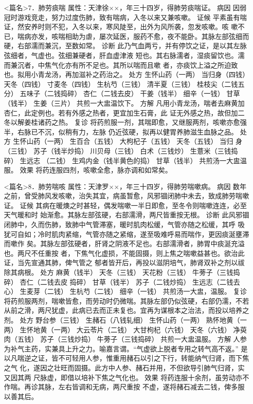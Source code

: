 \documentclass[a4paper,12pt,UTF8,twoside]{ctexbook}
\begin{document}
<篇名>7．肺劳痰喘
属性：天津徐××，年三十四岁，得肺劳痰喘证。 
病因 因弱冠时游戏竞走，努力过度伤肺，致有喘病，入冬以来又兼咳嗽。 
证候 平素虽有喘证，然安养时则不犯，入冬以来，寒风陡至，出外为风所袭，忽发咳嗽。咳 
嗽不已，喘病亦发，咳喘相助为虐，屡次延医，服药不愈，夜不能卧。其脉左部弦细而 
硬，右部濡而兼沉，至数如常。 
诊断 此乃气血两亏，并有停饮之证，是以其左脉弦细者，气虚也。弦细兼硬者，肝血虚津液 
短也。其右脉濡者，湿痰留饮也。濡而兼沉者，中焦气化亦有所不足也。其所以喘而且嗽 
者，亦痰饮上溢之所迫致也。拟用小青龙汤，再加滋补之药治之。 
处方 生怀山药（一两） 当归身（四钱） 天冬（四钱） 寸麦冬（四钱） 
生杭芍（三钱） 清半夏（三钱） 桂枝尖（二钱五分） 五味子（二钱捣碎） 
杏仁（二钱去皮） 干姜（钱半） 细辛（一钱） 甘草（钱半） 生姜（三片） 
共煎一大盅温饮下。 
方解 凡用小青龙汤，喘者去麻黄加杏仁，此定例也。若有外感之热者，更宜加生石膏，此 
证无外感之热，故但加二冬以解姜桂诸药之热。 
复诊 将药煎服一剂，其喘即愈，又继服两剂，咳嗽亦愈强半，右脉已不沉，似稍有力，左脉 
仍近弦硬，拟再以健胃养肺滋生血脉之品。 
处方 生怀山药（一两） 生百合（五钱） 大枸杞子（五钱） 天冬（五钱） 当归 
身（三钱） 苏子（钱半炒捣） 川贝母（三钱） 白术（三钱炒） 生薏米（三钱捣碎） 生远志 
（二钱） 生鸡内金（钱半黄色的捣） 甘草（钱半） 
共煎汤一大盅温服。 
效果 将药连服四剂，咳嗽全愈，脉亦调和如常矣。 


<篇名>8．肺劳喘咳
属性：天津罗××，年三十四岁，得肺劳喘嗽病。 
病因 数年之前，曾受肺风发咳嗽，治失其宜，病虽暂愈，风邪锢闭肺中未去，致成肺劳喘嗽证。 
证候 其病在暖燠之时甚轻，偶发喘嗽一半日即愈，至冬令则喘嗽连连，必至天气暖和时 
始渐愈。其脉左部弦硬，右部濡滑，两尺皆重按无根。 
诊断 此风邪锢闭肺中，久而伤肺，致肺中气管滞塞，暖时肌肉松缓，气管亦随之松缓，其呼 
吸犹可自如；冷时肌肉紧缩，气管亦随之紧缩，遂至吸难呼易而喘作，更因痰涎壅滞而嗽作 
矣。其脉左部弦硬者，肝肾之阴液不足也。右部濡滑者，肺胃中痰涎充溢也。两尺不任重按 
者，下焦气化虚损，不能固摄，则上焦之喘嗽益甚也。欲治此证，当先宣通其肺，俾气管之 
郁者皆开后，再投以滋阴培气，肺肾双补之剂以祓除其病根。 
处方 麻黄（钱半） 天冬（三钱） 天花粉（三钱） 牛蒡子（三钱捣碎） 杏仁（二钱去皮 
捣碎） 甘草（钱半） 苏子（二钱炒捣） 生远志（二钱去心） 
生麦芽（二钱） 生杭芍（二钱） 细辛（一钱） 
共煎汤一大盅，温服。 
复诊 将药煎服两剂，喘嗽皆愈，而劳动时仍微喘。其脉左部仍似弦硬，右部仍濡，不若 
从前之滑，两尺犹虚，此病已去而正未复也。宜再为谋根本之治法，而投以培养之剂。 
处方 野台参（三钱） 生赭石（八钱轧细） 生怀山药（一两） 熟怀地黄（一两） 
生怀地黄（一两） 大云苓片（二钱） 大甘枸杞（六钱） 天冬（六钱） 净萸肉（五钱） 
苏子（三钱炒捣） 牛蒡子（三钱捣碎） 
共煎一大盅温服。 
方解 人参为补气主药，实兼具上升之力。喻嘉言谓。“气虚欲上脱者专用之转气高不返。” 
是以凡喘逆之证，皆不可轻用人参，惟重用赭石以引之下行，转能纳气归肾，而下焦之气 
化，遂因之壮旺而固摄。此方中人参、赭石并用，不但欲导引肺气归肾，实又因其两 
尺脉虚，即借以培补下焦之气化也。 
效果 将药连服十余剂，虽劳动亦不作喘。再诊其脉，左右皆调和无病，两尺重按 
不虚，遂将赭石减去二钱，俾多服以善其后。 
\end{document}
